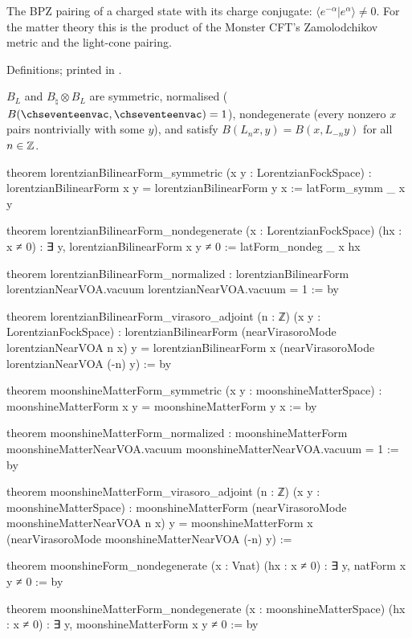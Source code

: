 \begin{physics}
The BPZ pairing of a charged state with its charge conjugate: $\langle e^{-\alpha}|e^\alpha\rangle\neq0$.  For the matter theory
this is the product of the Monster CFT's Zamolodchikov metric and the light-cone pairing.
\end{physics}

\begin{status}
Definitions; printed in .
\end{status}

\begin{theorem}\label{ch17:thm:matterform}
$B_L$ and $B_\natural\otimes B_L$ are symmetric, normalised ($B(\chseventeenvac,\chseventeenvac)=1$), nondegenerate (every nonzero $x$ pairs
nontrivially with some $y$), and satisfy $B(L_nx,y)=B(x,L_{-n}y)$ for all $n\in{\mathbb{Z}}$.
\end{theorem}

\begin{leancode}
theorem lorentzianBilinearForm_symmetric (x y : LorentzianFockSpace) :
    lorentzianBilinearForm x y = lorentzianBilinearForm y x := latForm_symm _ x y

theorem lorentzianBilinearForm_nondegenerate (x : LorentzianFockSpace) (hx : x ≠ 0) :
    ∃ y, lorentzianBilinearForm x y ≠ 0 := latForm_nondeg _ x hx

theorem lorentzianBilinearForm_normalized :
    lorentzianBilinearForm lorentzianNearVOA.vacuum lorentzianNearVOA.vacuum = 1 := by

theorem lorentzianBilinearForm_virasoro_adjoint (n : ℤ) (x y : LorentzianFockSpace) :
    lorentzianBilinearForm (nearVirasoroMode lorentzianNearVOA n x) y =
      lorentzianBilinearForm x (nearVirasoroMode lorentzianNearVOA (-n) y) := by

theorem moonshineMatterForm_symmetric (x y : moonshineMatterSpace) :
    moonshineMatterForm x y = moonshineMatterForm y x := by

theorem moonshineMatterForm_normalized :
    moonshineMatterForm moonshineMatterNearVOA.vacuum moonshineMatterNearVOA.vacuum = 1 := by

theorem moonshineMatterForm_virasoro_adjoint (n : ℤ) (x y : moonshineMatterSpace) :
    moonshineMatterForm (nearVirasoroMode moonshineMatterNearVOA n x) y =
      moonshineMatterForm x (nearVirasoroMode moonshineMatterNearVOA (-n) y) :=

theorem moonshineForm_nondegenerate (x : Vnat) (hx : x ≠ 0) : ∃ y, natForm x y ≠ 0 := by

theorem moonshineMatterForm_nondegenerate (x : moonshineMatterSpace) (hx : x ≠ 0) :
    ∃ y, moonshineMatterForm x y ≠ 0 := by
\end{leancode}

